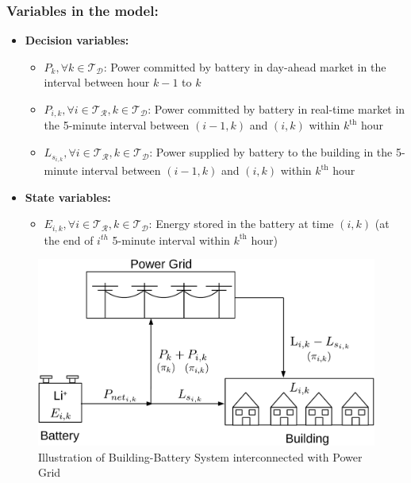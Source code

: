 \documentclass[11pt,twoside]{article}
\begin{document}
\subsubsection{Variables in the model:}
\begin{itemize}
\item \textbf{Decision variables:}
\begin{itemize}
\item[\textbullet] $P_{k}, \forall k \in \mathcal{T_D}$: Power committed by battery in day-ahead market in the interval between hour $k-1$ to $k$
\item[\textbullet] $P_{i,k}, \forall i \in \mathcal{T_R}, k \in \mathcal{T_D}$: Power committed by battery in real-time market in the 5-minute interval between $(i-1,k)$ and $(i,k)$ within $k^\text{th}$ hour
\item[\textbullet] $L_{s_{i,k}}, \forall i \in \mathcal{T_R}, k \in \mathcal{T_D}$: Power supplied by battery to the building in the 5-minute interval between $(i-1,k)$ and $(i,k)$ within $k^\text{th}$ hour 
\end{itemize}
\item \textbf{State variables:}
\begin{itemize}
\item[\textbullet] $E_{i,k}, \forall i \in \mathcal{T_R}, k \in \mathcal{T_D}$: Energy stored in the battery at time $(i,k)$ (at the end of $i^{th}$ 5-minute interval within $k^\text{th}$ hour) 
\end{itemize}
\end{itemize}

\begin{figure}[h!]
\begin{center}
\includegraphics[scale = 0.4]{Figures/system_blocks-crop.pdf} \caption{Illustration of Building-Battery System interconnected with Power Grid}\label{fig:system}\end{center}
\end{figure}
\end{document}
